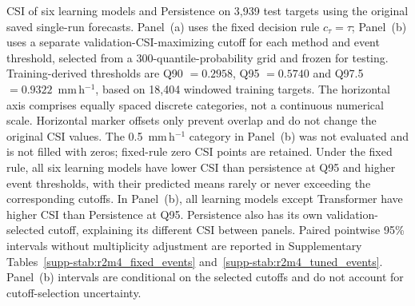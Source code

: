 CSI of six learning models and Persistence on 3,939 test targets using the original saved single-run forecasts. Panel~(a) uses the fixed decision rule $c_\tau=\tau$; Panel~(b) uses a separate validation-CSI-maximizing cutoff for each method and event threshold, selected from a 300-quantile-probability grid and frozen for testing. Training-derived thresholds are Q90 $=0.2958$, Q95 $=0.5740$ and Q97.5 $=0.9322$~mm\,h$^{-1}$, based on 18,404 windowed training targets. The horizontal axis comprises equally spaced discrete categories, not a continuous numerical scale. Horizontal marker offsets only prevent overlap and do not change the original CSI values. The 0.5~mm\,h$^{-1}$ category in Panel~(b) was not evaluated and is not filled with zeros; fixed-rule zero CSI points are retained. Under the fixed rule, all six learning models have lower CSI than persistence at Q95 and higher event thresholds, with their predicted means rarely or never exceeding the corresponding cutoffs. In Panel~(b), all learning models except Transformer have higher CSI than Persistence at Q95. Persistence also has its own validation-selected cutoff, explaining its different CSI between panels. Paired pointwise 95\% intervals without multiplicity adjustment are reported in Supplementary Tables~\ref{supp-stab:r2m4_fixed_events} and~\ref{supp-stab:r2m4_tuned_events}. Panel~(b) intervals are conditional on the selected cutoffs and do not account for cutoff-selection uncertainty.
